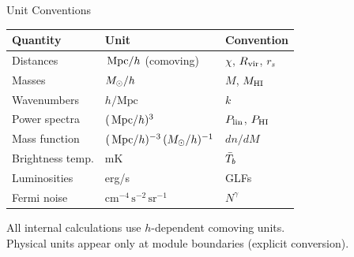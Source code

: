 \begin{frame}{Unit Conventions}
\begin{table}
\centering\footnotesize
\begin{tabular}{lll}
\toprule
Quantity & Unit & Convention \\
\midrule
Distances & $\,\mathrm{Mpc}/h$ (comoving) & $\chi$, $R_{\mathrm{vir}}$, $r_s$ \\
Masses & $M_\odot/h$ & $M$, $M_{\mathrm{HI}}$ \\
Wavenumbers & $h/\mathrm{Mpc}$ & $k$ \\
Power spectra & $(\,\mathrm{Mpc}/h)^3$ & $P_{\mathrm{lin}}$, $P_{\mathrm{HI}}$ \\
Mass function & $(\,\mathrm{Mpc}/h)^{-3}\,(M_\odot/h)^{-1}$ & $dn/dM$ \\
\midrule
Brightness temp. & mK & $\bar{T}_b$ \\
Luminosities & erg/s & GLFs \\
Fermi noise & $\mathrm{cm}^{-4}\,\mathrm{s}^{-2}\,\mathrm{sr}^{-1}$ & $N^\gamma$ \\
\bottomrule
\end{tabular}
\end{table}
\vspace{0.3cm}
All internal calculations use $h$-dependent comoving units.\\
Physical units appear only at module boundaries (explicit conversion).
\end{frame}

